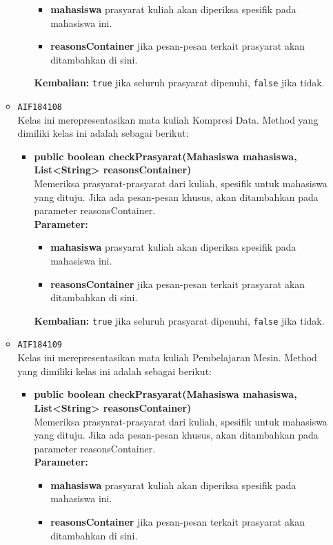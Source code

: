 \begin{enumerate}
\begin{itemize}
\begin{itemize}
\begin{itemize}
\item \textbf{mahasiswa} prasyarat kuliah akan diperiksa spesifik pada mahasiswa ini.
\item \textbf{reasonsContainer} jika pesan-pesan terkait prasyarat akan ditambahkan di sini.
\end{itemize}
\textbf{Kembalian:} \texttt{true} jika seluruh prasyarat dipenuhi, \texttt{false} jika tidak.
\end{itemize}
\item \texttt{AIF184108} \\
Kelas ini merepresentasikan mata kuliah Kompresi Data. Method yang dimiliki kelas ini adalah sebagai berikut: 
\begin{itemize}
\item \textbf{public boolean checkPrasyarat(Mahasiswa mahasiswa, List<String> reasonsContainer)}\\
Memeriksa prasyarat-prasyarat dari kuliah, spesifik untuk mahasiswa yang dituju. Jika ada pesan-pesan khusus, akan ditambahkan pada parameter reasonsContainer.\\
\textbf{Parameter:}
\begin{itemize}
\item \textbf{mahasiswa} prasyarat kuliah akan diperiksa spesifik pada mahasiswa ini.
\item \textbf{reasonsContainer} jika pesan-pesan terkait prasyarat akan ditambahkan di sini.
\end{itemize}
\textbf{Kembalian:} \texttt{true} jika seluruh prasyarat dipenuhi, \texttt{false} jika tidak.
\end{itemize}
\item \texttt{AIF184109} \\
Kelas ini merepresentasikan mata kuliah Pembelajaran Mesin. Method yang dimiliki kelas ini adalah sebagai berikut: 
\begin{itemize}
\item \textbf{public boolean checkPrasyarat(Mahasiswa mahasiswa, List<String> reasonsContainer)}\\
Memeriksa prasyarat-prasyarat dari kuliah, spesifik untuk mahasiswa yang dituju. Jika ada pesan-pesan khusus, akan ditambahkan pada parameter reasonsContainer.\\
\textbf{Parameter:}
\begin{itemize}
\item \textbf{mahasiswa} prasyarat kuliah akan diperiksa spesifik pada mahasiswa ini.
\item \textbf{reasonsContainer} jika pesan-pesan terkait prasyarat akan ditambahkan di sini.

\end{itemize}
\end{itemize}
\end{itemize}
\end{enumerate}
